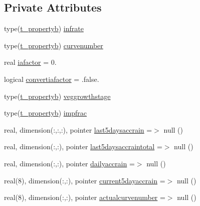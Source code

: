 \subsection*{Private Attributes}
\begin{DoxyCompactItemize}
\item 
type(\mbox{\hyperlink{structmodulebasin_1_1t__propertyb}{t\+\_\+propertyb}}) \mbox{\hyperlink{structmodulebasin_1_1t__scscnrunoffmodel_aef0580465ae5e750152c07c91484b145}{infrate}}
\item 
type(\mbox{\hyperlink{structmodulebasin_1_1t__propertyb}{t\+\_\+propertyb}}) \mbox{\hyperlink{structmodulebasin_1_1t__scscnrunoffmodel_a35a791e25261cfef55ed195630b51143}{curvenumber}}
\item 
real \mbox{\hyperlink{structmodulebasin_1_1t__scscnrunoffmodel_aebb0c7283eda823b8991ecd023ca283c}{iafactor}} = 0.
\item 
logical \mbox{\hyperlink{structmodulebasin_1_1t__scscnrunoffmodel_ab00beaf2b4ee67b6a9cdcbfd2f085ce8}{convertiafactor}} = .false.
\item 
type(\mbox{\hyperlink{structmodulebasin_1_1t__propertyb}{t\+\_\+propertyb}}) \mbox{\hyperlink{structmodulebasin_1_1t__scscnrunoffmodel_a9b0f4f64978436f0a713bc7cdf4924b5}{veggrowthstage}}
\item 
type(\mbox{\hyperlink{structmodulebasin_1_1t__propertyb}{t\+\_\+propertyb}}) \mbox{\hyperlink{structmodulebasin_1_1t__scscnrunoffmodel_a341a81b00c9c0a38a80c9b76df4f205d}{impfrac}}
\item 
real, dimension(\+:,\+:,\+:), pointer \mbox{\hyperlink{structmodulebasin_1_1t__scscnrunoffmodel_a2b4d1aed25857030d84077c0b015bdd7}{last5daysaccrain}} =$>$ null ()
\item 
real, dimension(\+:,\+:), pointer \mbox{\hyperlink{structmodulebasin_1_1t__scscnrunoffmodel_a3e66ba06bfc7f8291f213a316efa367a}{last5daysaccraintotal}} =$>$ null ()
\item 
real, dimension(\+:,\+:), pointer \mbox{\hyperlink{structmodulebasin_1_1t__scscnrunoffmodel_aa7c8a29a9bfa492e66ea979de83e4080}{dailyaccrain}} =$>$ null ()
\item 
real(8), dimension(\+:,\+:), pointer \mbox{\hyperlink{structmodulebasin_1_1t__scscnrunoffmodel_a8c28ff12946398c880e15b8737eab876}{current5dayaccrain}} =$>$ null ()
\item 
real(8), dimension(\+:,\+:), pointer \mbox{\hyperlink{structmodulebasin_1_1t__scscnrunoffmodel_a7f12a3b0673e016bf98f84d65cb8235a}{actualcurvenumber}} =$>$ null ()
\item 

\end{DoxyCompactItemize}
